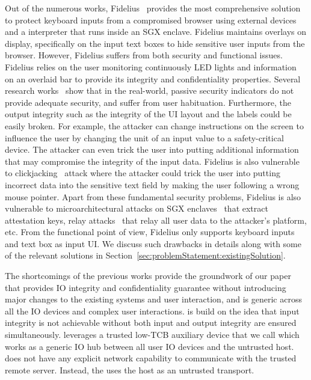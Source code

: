 Out of the numerous works, Fidelius~\cite{Fidelius} provides the most comprehensive solution to protect keyboard inputs from a compromised browser using external devices and a \js interpreter that runs inside an SGX enclave. 
Fidelius maintains overlays on display, specifically on the input text boxes to hide sensitive user inputs from the browser. 
However, Fidelius suffers from both security and functional issues. Fidelius relies on the user monitoring continuously LED lights and information on an overlaid bar to provide its integrity and confidentiality properties. Several research works~\cite{egelman2008you,sobey2008exploring} show that in the real-world, passive security indicators do not provide adequate security, and suffer from user habituation. Furthermore, the output integrity such as the integrity of the UI layout and the labels could be easily broken. For example, the attacker can change instructions on the screen to influence the user by changing the unit of an input value to a safety-critical device. The attacker can even trick the user into putting additional information that may compromise the integrity of the input data. 
Fidelius is also vulnerable to clickjacking~\cite{huang2012clickjacking} attack where the attacker could trick the user into putting incorrect data into the sensitive text field by making the user following a wrong mouse pointer.
Apart from these fundamental security problems, Fidelius is also vulnerable to  microarchitectural attacks on SGX enclaves~\cite{van2018foreshadow} that extract attestation keys, relay attacks~\cite{dhar2018proximitee} that relay all user data to the attacker's platform, etc. From the functional point of view, Fidelius only supports keyboard inputs and text box as input UI. We discuss such drawbacks in details along with some of the relevant solutions in Section~\ref{sec:problemStatement:existingSolution}. 
 
 
 The shortcomings of the previous works provide the groundwork of our paper \name that provides IO integrity and confidentiality guarantee without introducing major changes to the existing systems and user interaction, and is generic across all the IO devices and complex user interactions.
\name is build on the idea that input integrity is not achievable without both input and output integrity are ensured simultaneously. \name leverages a trusted low-TCB auxiliary device that we call \device which works as a generic IO hub between all user IO devices and the untrusted host. \device does not have any explicit network capability to communicate with the trusted remote server. Instead, the \device uses the host as an untrusted transport. 

